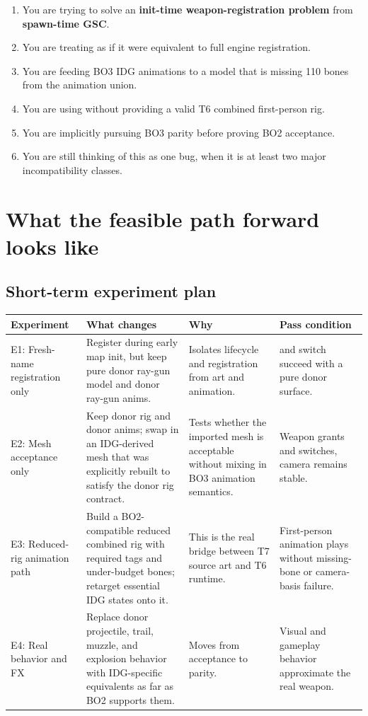 \documentclass[11pt]{article}
\begin{document}
\begin{enumerate}
  \item You are trying to solve an \textbf{init-time weapon-registration problem} from \textbf{spawn-time GSC}.
  \item You are treating  as if it were equivalent to full engine registration.
  \item You are feeding BO3 IDG animations to a model that is missing 110 bones from the animation union.
  \item You are using  without providing a valid T6 combined first-person rig.
  \item You are implicitly pursuing BO3 parity before proving BO2 acceptance.
  \item You are still thinking of this as one bug, when it is at least two major incompatibility classes.
\end{enumerate}

\section{What the feasible path forward looks like}

\subsection{Short-term experiment plan}

\begin{tabularx}{\textwidth}{p{}p{}Yp{0.18\textwidth}}
\toprule
\textbf{Experiment} & \textbf{What changes} & \textbf{Why} & \textbf{Pass condition} \\
\midrule
E1: Fresh-name registration only & Register  during early map init, but keep pure donor ray-gun model and donor ray-gun anims. & Isolates lifecycle and registration from art and animation. &  and switch succeed with a pure donor surface. \\
E2: Mesh acceptance only & Keep donor rig and donor anims; swap in an IDG-derived mesh that was explicitly rebuilt to satisfy the donor rig contract. & Tests whether the imported mesh is acceptable without mixing in BO3 animation semantics. & Weapon grants and switches, camera remains stable. \\
E3: Reduced-rig animation path & Build a BO2-compatible reduced combined rig with required tags and under-budget bones; retarget essential IDG states onto it. & This is the real bridge between T7 source art and T6 runtime. & First-person animation plays without missing-bone or camera-basis failure. \\
E4: Real behavior and FX & Replace donor projectile, trail, muzzle, and explosion behavior with IDG-specific equivalents as far as BO2 supports them. & Moves from acceptance to parity. & Visual and gameplay behavior approximate the real weapon. \\
\bottomrule
\end{tabularx}
\end{document}

